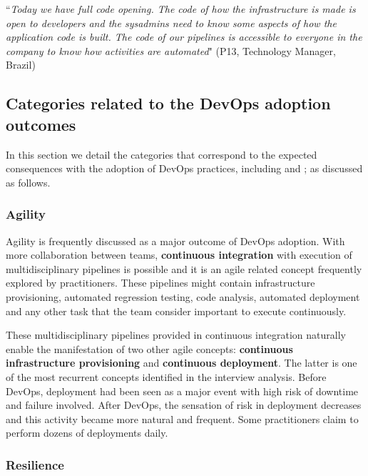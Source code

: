 \begin{mq}
``\emph{Today we have full code opening. The code of how the infrastructure is
made is open to developers and the sysadmins need to know some aspects of how
the application code is built. The code of our pipelines is accessible to
everyone in the company to know how activities are automated}" (P13, Technology
Manager, Brazil)
\end{mq}


\subsection{Categories related to the DevOps adoption outcomes}

In this section we detail the categories that correspond to
the expected consequences with the adoption of
DevOps practices, including  and ;
as discussed as follows.

\noindent
\subsubsection*{{\bf Agility}}

Agility is frequently discussed as a major outcome of DevOps adoption. With more
collaboration between teams, \textbf{continuous integration} with execution of
multidisciplinary pipelines is possible and it is an agile related concept
frequently explored by practitioners. These pipelines might contain
infrastructure provisioning, automated regression testing, code analysis,
automated deployment and any other task that the team consider important to
execute continuously.

These multidisciplinary pipelines provided in continuous integration naturally
enable the manifestation of two other agile concepts: \textbf{continuous
infrastructure provisioning} and \textbf{continuous deployment}. The latter is
one of the most recurrent concepts identified in the interview analysis. Before
DevOps, deployment had been seen as a major event with high risk of downtime and
failure involved. After DevOps, the sensation of risk in deployment decreases
and this activity became more natural and frequent. Some practitioners claim
to perform dozens of deployments daily.

\noindent
\subsubsection*{{\bf Resilience}}

